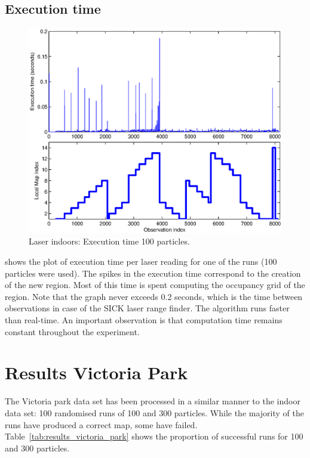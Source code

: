 \subsection{Execution time}


\begin{figure}[htbp]
  \centering
  \includegraphics[width=15cm]{Pics/corners_execution_time}
  
  \caption{Laser indoors: Execution time 100 particles.}
  \label{fig:corners_execution_time}
\end{figure}

 shows the plot of execution
time per laser reading for one of the runs (100 particles were used).
The spikes in the execution time correspond to the creation of the new
region. Most of this time is spent computing the occupancy grid of the
region. Note that the graph never exceeds 0.2 seconds, which is the
time between observations in case of the SICK laser range finder. The
algorithm runs faster than real-time. An important observation is that
computation time remains constant throughout the experiment.

\section {Results Victoria Park}

The Victoria park data set has been processed in a similar manner to
the indoor data set: 100 randomised runs of 100 and 300
particles. While the majority of the runs have produced a correct map,
some have failed. Table~\ref{tab:results_victoria_park} shows the
proportion of successful runs for 100 and 300 particles.


